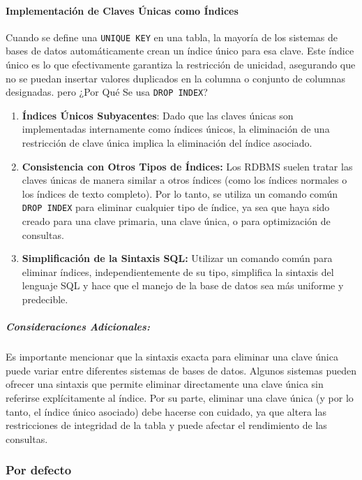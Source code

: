     \paragraph{Implementación de Claves Únicas como Índices} Cuando se define una \texttt{UNIQUE KEY} en una tabla, la mayoría de los sistemas de bases de datos automáticamente crean un índice único para esa clave. Este índice único es lo que efectivamente garantiza la restricción de unicidad, asegurando que no se puedan insertar valores duplicados en la columna o conjunto de columnas designadas. pero ¿Por Qué Se usa \texttt{DROP INDEX}?

    \begin{enumerate}
        \item \textbf{Índices Únicos Subyacentes}: Dado que las claves únicas son implementadas internamente como índices únicos, la eliminación de una restricción de clave única implica la eliminación del índice asociado.
        \item \textbf{Consistencia con Otros Tipos de Índices:} Los RDBMS suelen tratar las claves únicas de manera similar a otros índices (como los índices normales o los índices de texto completo). Por lo tanto, se utiliza un comando común \texttt{DROP INDEX} para eliminar cualquier tipo de índice, ya sea que haya sido creado para una clave primaria, una clave única, o para optimización de consultas.
        \item \textbf{Simplificación de la Sintaxis SQL:} Utilizar un comando común para eliminar índices, independientemente de su tipo, simplifica la sintaxis del lenguaje SQL y hace que el manejo de la base de datos sea más uniforme y predecible.
    \end{enumerate}

    \subparagraph{Consideraciones Adicionales:} Es importante mencionar que la sintaxis exacta para eliminar una clave única puede variar entre diferentes sistemas de bases de datos. Algunos sistemas pueden ofrecer una sintaxis que permite eliminar directamente una clave única sin referirse explícitamente al índice. Por su parte, eliminar una clave única (y por lo tanto, el índice único asociado) debe hacerse con cuidado, ya que altera las restricciones de integridad de la tabla y puede afectar el rendimiento de las consultas.


    \subsubsection{Por defecto}

